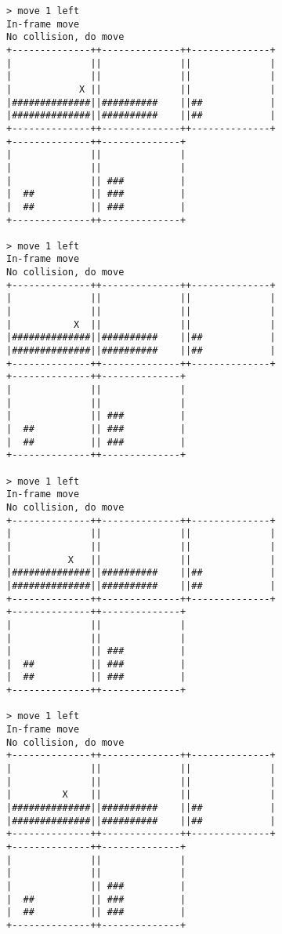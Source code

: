 \begin{verbatim}
> move 1 left
In-frame move
No collision, do move
+--------------++--------------++--------------+
|              ||              ||              |
|              ||              ||              |
|            X ||              ||              |
|##############||##########    ||##            |
|##############||##########    ||##            |
+--------------++--------------++--------------+
+--------------++--------------+                
|              ||              |                
|              ||              |                
|              || ###          |                
|  ##          || ###          |                
|  ##          || ###          |                
+--------------++--------------+                

> move 1 left
In-frame move
No collision, do move
+--------------++--------------++--------------+
|              ||              ||              |
|              ||              ||              |
|           X  ||              ||              |
|##############||##########    ||##            |
|##############||##########    ||##            |
+--------------++--------------++--------------+
+--------------++--------------+                
|              ||              |                
|              ||              |                
|              || ###          |                
|  ##          || ###          |                
|  ##          || ###          |                
+--------------++--------------+                

> move 1 left
In-frame move
No collision, do move
+--------------++--------------++--------------+
|              ||              ||              |
|              ||              ||              |
|          X   ||              ||              |
|##############||##########    ||##            |
|##############||##########    ||##            |
+--------------++--------------++--------------+
+--------------++--------------+                
|              ||              |                
|              ||              |                
|              || ###          |                
|  ##          || ###          |                
|  ##          || ###          |                
+--------------++--------------+                

> move 1 left
In-frame move
No collision, do move
+--------------++--------------++--------------+
|              ||              ||              |
|              ||              ||              |
|         X    ||              ||              |
|##############||##########    ||##            |
|##############||##########    ||##            |
+--------------++--------------++--------------+
+--------------++--------------+                
|              ||              |                
|              ||              |                
|              || ###          |                
|  ##          || ###          |                
|  ##          || ###          |                
+--------------++--------------+                


\end{verbatim}
